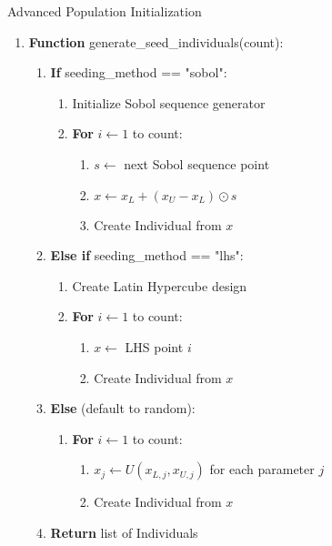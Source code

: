 \documentclass[12pt,a4paper]{article}
\begin{document}
\begin{algorithm}
\caption{Advanced Population Initialization}
\begin{enumerate}
    \item \textbf{Function} generate\_seed\_individuals(count):
    \begin{enumerate}
        \item \textbf{If} seeding\_method == "sobol":
        \begin{enumerate}
            \item Initialize Sobol sequence generator
            \item \textbf{For} $i \leftarrow 1$ to count:
            \begin{enumerate}
                \item $s \leftarrow$ next Sobol sequence point
                \item $x \leftarrow x_L + (x_U - x_L) \odot s$
                \item Create Individual from $x$
            \end{enumerate}
        \end{enumerate}
        \item \textbf{Else if} seeding\_method == "lhs":
        \begin{enumerate}
            \item Create Latin Hypercube design
            \item \textbf{For} $i \leftarrow 1$ to count:
            \begin{enumerate}
                \item $x \leftarrow$ LHS point $i$
                \item Create Individual from $x$
            \end{enumerate}
        \end{enumerate}
        \item \textbf{Else} (default to random):
        \begin{enumerate}
            \item \textbf{For} $i \leftarrow 1$ to count:
            \begin{enumerate}
                \item $x_j \leftarrow U(x_{L,j}, x_{U,j})$ for each parameter $j$
                \item Create Individual from $x$
            \end{enumerate}
        \end{enumerate}
        \item \textbf{Return} list of Individuals
    \end{enumerate}
\end{enumerate}
\end{algorithm}
\end{document}
